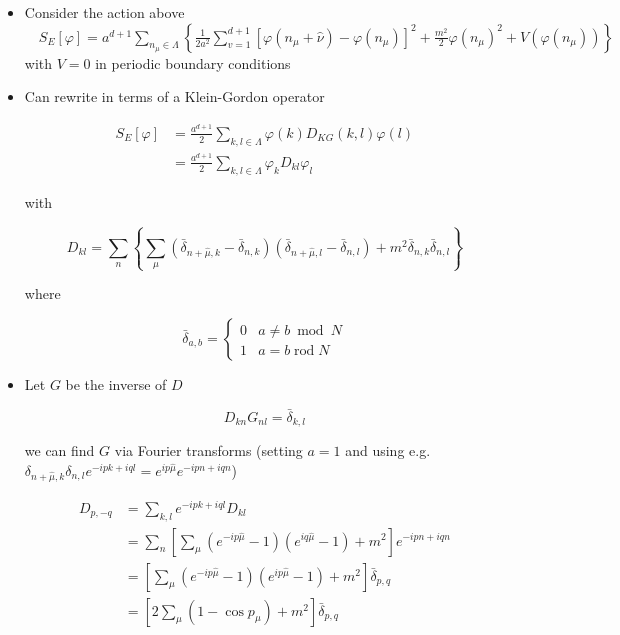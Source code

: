 \begin{itemize}
  \item Consider the action above \(\quad S_{E}[\varphi]=a^{d+1} \sum_{n_{\mu}\in\Lambda}\left\{\frac{1}{2 a^{2}} \sum_{v=1}^{d+1}\left[\varphi\left(n_{\mu}+\hat{\nu}\right)-\varphi\left(n_{\mu}\right)\right]^{2}+\frac{m^{2}}{2} \varphi\left(n_{\mu}\right)^{2}+V\left(\varphi\left(n_{\mu}\right)\right)\right\}\) with \(V=0\) in periodic boundary conditions
  \item Can rewrite in terms of a Klein-Gordon operator

\begin{equation}
\begin{aligned}
S_{E}[\varphi] & =\frac{a^{d+1}}{2} \sum_{k, l \in \Lambda} \varphi(k) D_{KG}(k, l) \varphi(l) \\
& =\frac{a^{d+1}}{2} \sum_{k, l \in \Lambda} \varphi_{k} D_{k l} \varphi_{l}
\end{aligned}
\end{equation}

with

\begin{equation}
D_{k l}=\sum_{n}\left\{\sum_{\mu}\left(\bar{\delta}_{n+ \hat{\mu}, k}-\bar{\delta}_{n, k}\right)\left(\bar{\delta}_{n+ \hat{\mu}, l}-\bar{\delta}_{n, l}\right)+m^{2} \bar{\delta}_{n, k} \bar{\delta}_{n, l}\right\}
\end{equation}

where

\begin{equation}
\bar{\delta}_{a, b}= \begin{cases}0 & a \neq b \bmod N \\ 1 & a=b \operatorname{rod} N\end{cases}
\end{equation}

  \item Let \(G\) be the inverse of \(D\)

\begin{equation}
D_{k n} G_{n l}=\bar{\delta}_{k, l}
\end{equation}

we can find \(G\) via Fourier transforms (setting \(a=1\) and using e.g. $ \delta_{n+\hat\mu, k} \delta_{n, l} e^{-i p k+i q l}=e^{i p \hat{\mu}} e^{-i p n+i q n}$)

\begin{equation}
\begin{aligned}
 D_{p,-q}&=\sum_{k, l} e^{-i p k+i q l} D_{k l}  \\
& =\sum_{n}\left[\sum_{\mu}\left(e^{-i p \hat{\mu}}-1\right)\left(e^{i q \hat{\mu}}-1\right)+m^{2}\right] e^{-i p n+i q n} \\
& =\left[\sum_{\mu}\left(e^{-i p \hat{\mu}}-1\right)\left(e^{i p \hat{\mu}}-1\right)+m^{2}\right] \bar{\delta}_{p, q} \\
& =\left[2 \sum_{\mu}\left(1-\cos p_{\mu}\right)+m^{2}\right] \bar{\delta}_{p, q}
\end{aligned}
\end{equation}


\end{itemize}
